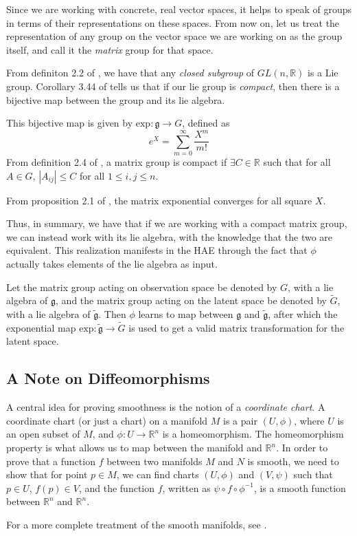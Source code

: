\documentclass[10pt]{article} %
\begin{document}
 Since we are working with concrete, real vector spaces, it helps to speak of groups in terms of their representations on these spaces. From now on, let us treat the representation of any group on the vector space we are working on as the group itself, and call it the \textit{matrix} group for that space.
 
 From definiton 2.2 of \cite{hall2000elementary}, we have that any \textit{closed subgroup} of $GL(n, \mathbb{R})$ is a Lie group. Corollary 3.44 of \cite{hall2015lie} tells us that if our lie group is \textit{compact}, then there is a bijective map between the group and its lie algebra.

 This bijective map is given by $\text{exp}: \mathfrak{g} \rightarrow G$, defined as 
 \[ 
 e^X = \sum_{m = 0 }^{\infty} \frac{X^m }{m!}
 \]
 From definition 2.4 of \cite{hall2015lie}, a matrix group is compact if $\exists C \in \mathbb{R}$ such that for all $A \in G$, $|A_{ij}| \leq C$ for all $1 \leq i, j \leq n$.

 From proposition 2.1 of \cite{hall2015lie}, the matrix exponential converges for all square $X$. 


 Thus, in summary, we have that if we are working with a compact matrix group, we can instead work with its lie algebra, with the knowledge that the two are equivalent. This realization manifests in the HAE through the fact that $\phi$ actually takes elements of the lie algebra as input.

 Let the matrix group acting on observation space be denoted by $G$, with a lie algebra of $\mathfrak{g}$, and the matrix group acting on the latent space be denoted by $\tilde{G}$, with a lie algebra of $\tilde{\mathfrak{g}}$. Then $\phi$ learns to map between $\mathfrak{g}$ and $\tilde{\mathfrak{g}}$, after which the exponential map $\text{exp}:\tilde{\mathfrak{g}}\rightarrow \tilde{G}$ is used to get a valid matrix transformation for the latent space.
 
\subsection{A Note on Diffeomorphisms}
A central idea for proving smoothness is the notion of a \textit{coordinate chart}. A coordinate chart (or just a chart) on a manifold $M$ is a pair $(U, \phi)$, where $U$ is an open subset of $M$, and $\phi: U \rightarrow \mathbb{R}^n$ is a homeomorphism. The homeomorphism property is what allows us to map between the manifold and $\mathbb{R}^n$.
In order to prove that a function $f$ between two manifolds $M$ and $N$ is smooth, we need to show that for point $p \in M$, we can find charts $(U, \phi)$ and $(V, \psi)$ such that $p \in U$, $f(p) \in V $, and the function $f$, written as $\psi \circ f \circ \phi^{-1}$, is a smooth function between $\mathbb{R}^n$ and $\mathbb{R}^n$.

For a more complete treatment of the smooth manifolds, see \cite{lee2013introduction}.
\end{document}
